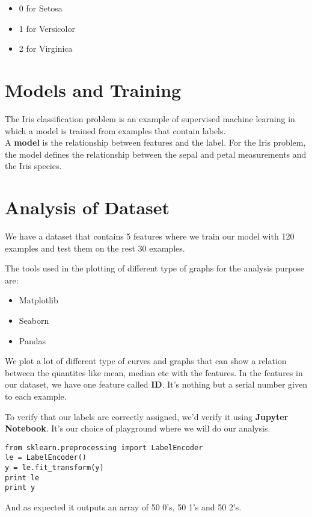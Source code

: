 \documentclass[11pt,letterpaper]{article}
\begin{document}
\begin{itemize}
\item 0 for Setosa
\item 1 for Versicolor
\item 2 for Virginica
\end{itemize}

\section{Models and Training}
The Iris classification problem is an example of supervised machine learning in which a model is trained from examples that contain labels.\\

\noindent
A \textbf{model} is the relationship between features and the label. For the Iris problem, the model defines the relationship between the sepal and petal measurements and the Iris species.

\newpage

\section{Analysis of Dataset}
We have a dataset that contains 5 features where we train our model with 120 examples and test them on the rest 30 examples.

\noindent
The tools used in the plotting of different type of graphs for the analysis purpose are:
\begin{itemize}
\item Matplotlib
\item Seaborn
\item Pandas
\end{itemize}

\noindent
We plot a lot of different type of curves and graphs that can show a relation between the quantites like mean, median etc with the features.
In the features in our dataset, we have one feature called \textbf{ID}.
It's nothing but a serial number given to each example.

\noindent
To verify that our labels are correctly assigned, we'd verify it using \textbf{Jupyter Notebook}. It's our choice of playground where we will do our analysis.


\begin{lstlisting}
from sklearn.preprocessing import LabelEncoder
le = LabelEncoder()
y = le.fit_transform(y)
print le
print y
\end{lstlisting}

\noindent
And as expected it outputs an array of 50 0's, 50 1's and 50 2's.

\end{document}

